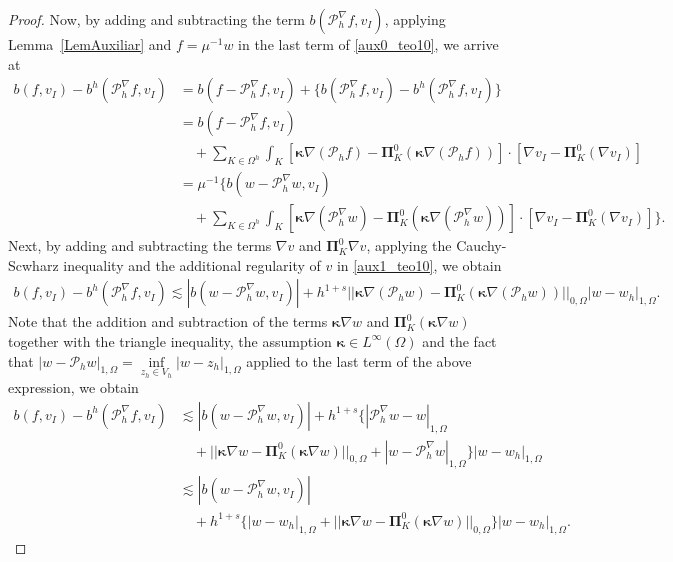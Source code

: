 \documentclass[final,reqno]{elsarticle}
\def\bkappa{\boldsymbol{\kappa}}
\def\bPi{\mathbf{\Pi}}
\begin{document}
\begin{proof}
Now, by adding and subtracting the term $b(\mathcal{P}_h^\nabla f,v_I)$,  applying  Lemma~\ref{LemAuxiliar} and $f=\mu^{-1}w$ in the last term of \eqref{aux0_teo10}, we arrive at
\begin{align}
b(f,v_I) - b^h(\mathcal{P}_h^{\nabla} f,v_I)  &=   b(f-\mathcal{P}_h^\nabla f,v_I) + \{ b(\mathcal{P}_h^{\nabla} f,v_I)-b^h(\mathcal{P}_h^{\nabla} f,v_I) \}\nonumber\\
&= b(f-\mathcal{P}_h^\nabla f,v_I) \nonumber\\
&\quad + \sum\limits_{K\in \Omega^h} \int_K [\bkappa \nabla(\mathcal{P}_hf)-\bPi_K^0(\bkappa \nabla(\mathcal{P}_hf))]\cdot [\nabla v_I - \bPi_K^0(\nabla v_I)]\nonumber\\
&= \mu^{-1}\Bigg\{ b(w-\mathcal{P}_h^\nabla w,v_I) \nonumber\\
&\quad + \sum\limits_{K\in \Omega^h} \int_K [\bkappa \nabla(\mathcal{P}_h^\nabla w)-\bPi_K^0(\bkappa \nabla(\mathcal{P}_h^\nabla w))]\cdot [\nabla v_I - \bPi_K^0(\nabla v_I)]\Bigg\}.\label{aux1_teo10}
\end{align}
Next, by adding and subtracting the terms $\nabla v$ and $\bPi_K^0 \nabla v$, applying the Cauchy-Scwharz inequality and the additional regularity of $v$ in  \eqref{aux1_teo10}, we obtain
\begin{align}
b(f,v_I) - b^h(\mathcal{P}_h^{\nabla} f,v_I)  \lesssim |b(w-\mathcal{P}_h^\nabla w,v_I)| + h^{1+s}||\bkappa \nabla(\mathcal{P}_hw)-\bPi_K^0(\bkappa \nabla(\mathcal{P}_hw)) ||_{0,\Omega}|w-w_h|_{1,\Omega}\nonumber.
\end{align}
Note that the addition and subtraction of the terms $\bkappa \nabla w$ and $\bPi_K^0 (\bkappa\nabla w)$ together with the triangle inequality, the assumption $\bkappa \in L^{\infty}(\Omega)
$ and the fact that $|w-\mathcal{P}_hw|_{1,\Omega}=\inf\limits_{z_h\in V_h}|w-z_h|_{1,\Omega}$ applied to the last term of the above expression, we obtain
\begin{align}
    b(f,v_I) - b^h(\mathcal{P}_h^{\nabla} f,v_I) 
    &\lesssim |b(w-\mathcal{P}_h^\nabla w,v_I)|+ h^{1+s}\Big\{ |\mathcal{P}_h^\nabla w-w|_{1,\Omega} \nonumber\\
    &\quad + ||\bkappa \nabla  w - \bPi_K^0(\bkappa \nabla w)  ||_{0,\Omega}+ |w-\mathcal{P}_h^\nabla w|_{1,\Omega} \Big\}|w-w_h|_{1,\Omega}\nonumber\\
        &\lesssim |b(w-\mathcal{P}_h^\nabla w,v_I)| \nonumber \\
        &\quad + h^{1+s}\Big\{ |w-w_h|_{1,\Omega} + ||\bkappa \nabla w - \bPi_K^0(\bkappa \nabla w)  ||_{0,\Omega}\Big\}|w-w_h|_{1,\Omega}\label{aux3cotateo10}.
\end{align}


\end{proof}
\end{document}
